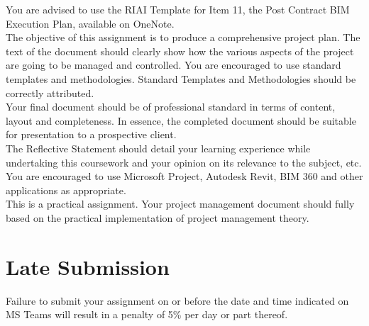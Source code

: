 You are advised to use the RIAI Template for Item 11, the Post Contract BIM Execution Plan, available on OneNote.\\

The objective of this assignment is to produce a comprehensive project plan. The text of the document should clearly show how the various aspects of the project are going to be managed and controlled. You are encouraged to use standard templates and methodologies.  Standard Templates and Methodologies should be correctly attributed.\\

Your final document should be of professional standard in terms of content, layout and completeness. In essence, the completed document should be suitable for presentation to a prospective client.\\

The Reflective Statement should detail your learning experience while undertaking this coursework and your opinion on its relevance to the subject, etc.\\

You are encouraged to use Microsoft Project, Autodesk Revit, BIM 360 and other applications as appropriate.\\

This is a practical assignment. Your project management document should fully based on the practical implementation of project management theory.\\


\section*{Late Submission}
Failure to submit your assignment on or before the date and time indicated on MS Teams will result in a penalty of 5\% per day or part thereof.


\newpage

